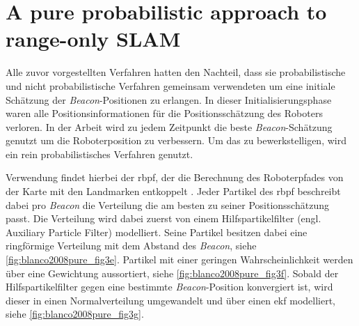 %
%


%
%
%
\section{A pure probabilistic approach to range-only SLAM}\label{sec:blanco2008pure}

Alle zuvor vorgestellten Verfahren hatten den Nachteil, dass sie probabilistische und nicht probabilistische Verfahren gemeinsam verwendeten um eine initiale Schätzung der \textit{Beacon}-Positionen zu erlangen. In dieser Initialisierungsphase waren alle Positionsinformationen für die Positionsschätzung des Roboters verloren. In der Arbeit  \cite{blanco2008pure} wird zu jedem Zeitpunkt die beste \textit{Beacon}-Schätzung genutzt um die Roboterposition zu verbessern. Um das zu bewerkstelligen, wird ein rein probabilistisches Verfahren genutzt.

Verwendung findet hierbei der \Gls{rbpf}, der die Berechnung des Roboterpfades von der Karte mit den Landmarken entkoppelt \cite{murphy2001rao, montemerlo2002fastslam}. Jeder Partikel des \Gls{rbpf} beschreibt dabei pro \textit{Beacon} die Verteilung die am besten zu seiner Positionsschätzung passt. Die Verteilung wird dabei zuerst von einem Hilfspartikelfilter (engl. Auxiliary Particle Filter) modelliert. Seine Partikel besitzen dabei eine ringförmige Verteilung mit dem Abstand des \textit{Beacon}, siehe \autoref{fig:blanco2008pure_fig3e}. Partikel mit einer geringen Wahrscheinlichkeit werden über eine Gewichtung aussortiert, siehe \autoref{fig:blanco2008pure_fig3f}. Sobald der Hilfspartikelfilter gegen eine bestimmte \textit{Beacon}-Position konvergiert ist, wird dieser in einen Normalverteilung umgewandelt und über einen \Gls{ekf} modelliert, siehe \autoref{fig:blanco2008pure_fig3g}.

